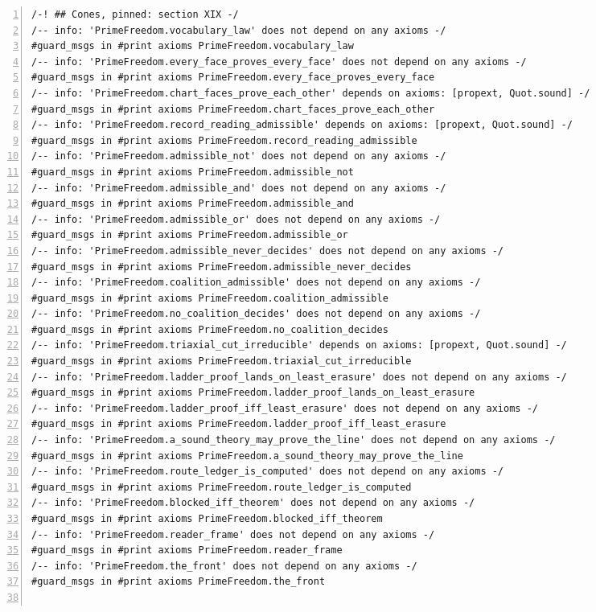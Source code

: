 \documentclass[10pt]{article}
\newcommand{\leansize}{\fontsize{5.5pt}{6.75pt}\selectfont}
\begin{document}
\begin{multicols}{2}
\begin{Verbatim}[numbers=left,firstnumber=1,numbersep=3pt,xleftmargin=2.6em,breaklines=true,breakanywhere=true,breakautoindent=false,breakindent=1.4em,breaksymbolleft={},breakanywheresymbolpre={},fontsize=\leansize]
/-! ## Cones, pinned: section XIX -/
/-- info: 'PrimeFreedom.vocabulary_law' does not depend on any axioms -/
#guard_msgs in #print axioms PrimeFreedom.vocabulary_law
/-- info: 'PrimeFreedom.every_face_proves_every_face' does not depend on any axioms -/
#guard_msgs in #print axioms PrimeFreedom.every_face_proves_every_face
/-- info: 'PrimeFreedom.chart_faces_prove_each_other' depends on axioms: [propext, Quot.sound] -/
#guard_msgs in #print axioms PrimeFreedom.chart_faces_prove_each_other
/-- info: 'PrimeFreedom.record_reading_admissible' depends on axioms: [propext, Quot.sound] -/
#guard_msgs in #print axioms PrimeFreedom.record_reading_admissible
/-- info: 'PrimeFreedom.admissible_not' does not depend on any axioms -/
#guard_msgs in #print axioms PrimeFreedom.admissible_not
/-- info: 'PrimeFreedom.admissible_and' does not depend on any axioms -/
#guard_msgs in #print axioms PrimeFreedom.admissible_and
/-- info: 'PrimeFreedom.admissible_or' does not depend on any axioms -/
#guard_msgs in #print axioms PrimeFreedom.admissible_or
/-- info: 'PrimeFreedom.admissible_never_decides' does not depend on any axioms -/
#guard_msgs in #print axioms PrimeFreedom.admissible_never_decides
/-- info: 'PrimeFreedom.coalition_admissible' does not depend on any axioms -/
#guard_msgs in #print axioms PrimeFreedom.coalition_admissible
/-- info: 'PrimeFreedom.no_coalition_decides' does not depend on any axioms -/
#guard_msgs in #print axioms PrimeFreedom.no_coalition_decides
/-- info: 'PrimeFreedom.triaxial_cut_irreducible' depends on axioms: [propext, Quot.sound] -/
#guard_msgs in #print axioms PrimeFreedom.triaxial_cut_irreducible
/-- info: 'PrimeFreedom.ladder_proof_lands_on_least_erasure' does not depend on any axioms -/
#guard_msgs in #print axioms PrimeFreedom.ladder_proof_lands_on_least_erasure
/-- info: 'PrimeFreedom.ladder_proof_iff_least_erasure' does not depend on any axioms -/
#guard_msgs in #print axioms PrimeFreedom.ladder_proof_iff_least_erasure
/-- info: 'PrimeFreedom.a_sound_theory_may_prove_the_line' does not depend on any axioms -/
#guard_msgs in #print axioms PrimeFreedom.a_sound_theory_may_prove_the_line
/-- info: 'PrimeFreedom.route_ledger_is_computed' does not depend on any axioms -/
#guard_msgs in #print axioms PrimeFreedom.route_ledger_is_computed
/-- info: 'PrimeFreedom.blocked_iff_theorem' does not depend on any axioms -/
#guard_msgs in #print axioms PrimeFreedom.blocked_iff_theorem
/-- info: 'PrimeFreedom.reader_frame' does not depend on any axioms -/
#guard_msgs in #print axioms PrimeFreedom.reader_frame
/-- info: 'PrimeFreedom.the_front' does not depend on any axioms -/
#guard_msgs in #print axioms PrimeFreedom.the_front


\end{Verbatim}
\end{multicols}
\end{document}
